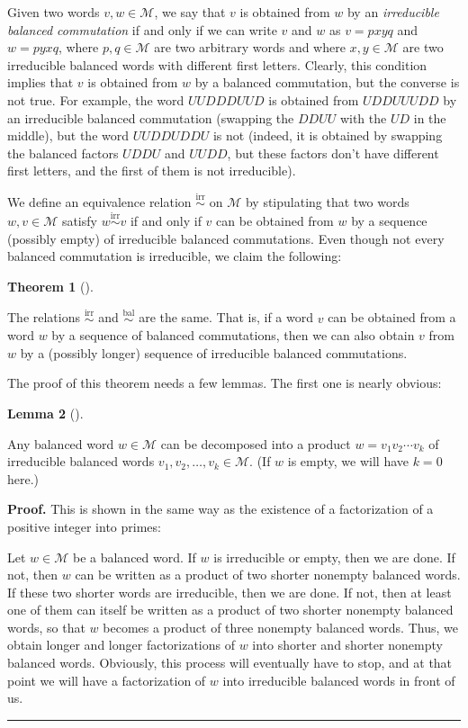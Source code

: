 \documentclass[numbers=enddot,12pt,final,onecolumn,notitlepage]{scrartcl}%
\theoremstyle{definition}
\newtheorem{theo}{Theorem}[section]
\newenvironment{theorem}[1][]
{\begin{theo}[#1]\begin{leftbar}}
{\end{leftbar}\end{theo}}
\newtheorem{lem}[theo]{Lemma}
\newenvironment{lemma}[1][]
{\begin{lem}[#1]\begin{leftbar}}
{\end{leftbar}\end{lem}}
\newenvironment{proof}[1][Proof]{\noindent\textbf{#1.} }{\ \rule{0.5em}{0.5em}}
\newcommand{\M}{\mathcal{M}}
\newcommand{\balsim}{\overset{\operatorname*{bal}}{\sim}}
\newcommand{\irrsim}{\overset{\operatorname*{irr}}{\sim}}
\begin{document}
Given two words $v,w\in\M$, we say that $v$ is obtained from
$w$ by an \emph{irreducible balanced commutation} if and only if we can write $v$ and $w$
as $v=pxyq$ and $w=pyxq$, where $p,q\in\M$ are two arbitrary words and where
$x,y\in\M$ are two irreducible balanced words with different first letters.
Clearly, this condition implies that $v$ is obtained from $w$ by a balanced commutation, but the converse is not true.
For example, the word $UUDDDUUD$ is obtained from $UDDUUUDD$ by an irreducible balanced commutation (swapping the $DDUU$ with the $UD$ in the middle), but the word $UUDDUDDU$ is not (indeed, it is obtained by swapping the balanced factors $UDDU$ and $UUDD$, but these factors don't have different first letters, and the first of them is not irreducible).

We define an equivalence relation $\irrsim$ on
$\M$ by stipulating that two words $w,v\in\M$ satisfy
$w \irrsim v$ if and only if $v$ can be obtained
from $w$ by a sequence (possibly empty) of irreducible balanced commutations.
Even though not every balanced commutation is irreducible, we claim the following:

\begin{theorem}
    \label{thm.irr=bal}
    The relations $\irrsim$ and $\balsim$ are the same.
    That is, if a word $v$ can be obtained from a word $w$ by a sequence of balanced commutations, then we can also obtain $v$ from $w$ by a (possibly longer) sequence of irreducible balanced commutations.
\end{theorem}

The proof of this theorem needs a few lemmas. The first one is nearly obvious:

\begin{lemma}
\label{lem.irr.fac}
Any balanced word $w\in\M$ can be decomposed into
a product $w=v_{1}v_{2}\cdots v_{k}$ of irreducible balanced words
$v_{1},v_{2},\ldots,v_{k}\in\M$. (If $w$ is empty, we will have $k=0$ here.)
\end{lemma}

\begin{proof}
This is shown in the same way as the existence of a factorization of a
positive integer into primes:

Let $w\in\M$ be a balanced word. If $w$ is irreducible or empty, then
we are done. If not, then $w$ can be written as a product of two shorter
nonempty balanced words. If these two shorter words are irreducible, then we
are done. If not, then at least one of them can itself be written as a product
of two shorter nonempty balanced words, so that $w$ becomes a product of three
nonempty balanced words. Thus, we obtain longer and longer factorizations of
$w$ into shorter and shorter nonempty balanced words. Obviously, this process
will eventually have to stop, and at that point we will have a factorization
of $w$ into irreducible balanced words in front of us.
\end{proof}
\end{document}
